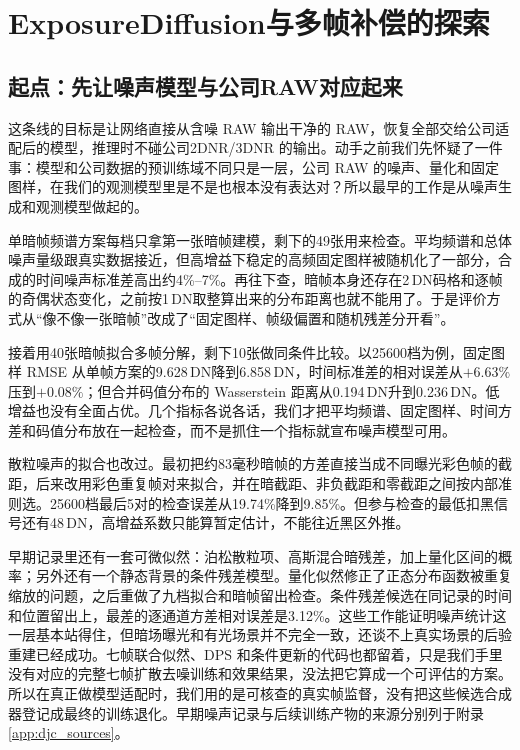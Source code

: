 \documentclass[11pt,a4paper,UTF8,fontset=fandol]{ctexart}
\newcommand{\dn}{\ensuremath{\,\mathrm{DN}}}
\begin{document}
\section{ExposureDiffusion与多帧补偿的探索}
\label{sec:djc}

\subsection{起点：先让噪声模型与公司RAW对应起来}

这条线的目标是让网络直接从含噪 RAW 输出干净的 RAW，恢复全部交给公司适配后的模型，推理时不碰公司2DNR/3DNR 的输出。动手之前我们先怀疑了一件事：模型和公司数据的预训练域不同只是一层，公司 RAW 的噪声、量化和固定图样，在我们的观测模型里是不是也根本没有表达对？所以最早的工作是从噪声生成和观测模型做起的。

单暗帧频谱方案每档只拿第一张暗帧建模，剩下的49张用来检查。平均频谱和总体噪声量级跟真实数据接近，但高增益下稳定的高频固定图样被随机化了一部分，合成的时间噪声标准差高出约4\%--7\%。再往下查，暗帧本身还存在2\dn{}码格和逐帧的奇偶状态变化，之前按1\dn{}取整算出来的分布距离也就不能用了。于是评价方式从“像不像一张暗帧”改成了“固定图样、帧级偏置和随机残差分开看”。

接着用40张暗帧拟合多帧分解，剩下10张做同条件比较。以25600档为例，固定图样 RMSE 从单帧方案的9.628\dn{}降到6.858\dn，时间标准差的相对误差从$+6.63\%$压到$+0.08\%$；但合并码值分布的 Wasserstein 距离从0.194\dn{}升到0.236\dn。低增益也没有全面占优。几个指标各说各话，我们才把平均频谱、固定图样、时间方差和码值分布放在一起检查，而不是抓住一个指标就宣布噪声模型可用。

散粒噪声的拟合也改过。最初把约83毫秒暗帧的方差直接当成不同曝光彩色帧的截距，后来改用彩色重复帧对来拟合，并在暗截距、非负截距和零截距之间按内部准则选。25600档最后5对的检查误差从19.74\%降到9.85\%。但参与检查的最低扣黑信号还有48\dn，高增益系数只能算暂定估计，不能往近黑区外推。

早期记录里还有一套可微似然：泊松散粒项、高斯混合暗残差，加上量化区间的概率；另外还有一个静态背景的条件残差模型。量化似然修正了正态分布函数被重复缩放的问题，之后重做了九档拟合和暗帧留出检查。条件残差候选在同记录的时间和位置留出上，最差的逐通道方差相对误差是3.12\%。这些工作能证明噪声统计这一层基本站得住，但暗场曝光和有光场景并不完全一致，还谈不上真实场景的后验重建已经成功。七帧联合似然、DPS 和条件更新的代码也都留着，只是我们手里没有对应的完整七帧扩散去噪训练和效果结果，没法把它算成一个可评估的方案。所以在真正做模型适配时，我们用的是可核查的真实帧监督，没有把这些候选合成器登记成最终的训练退化。早期噪声记录与后续训练产物的来源分别列于附录\ref{app:djc_sources}。
\end{document}

